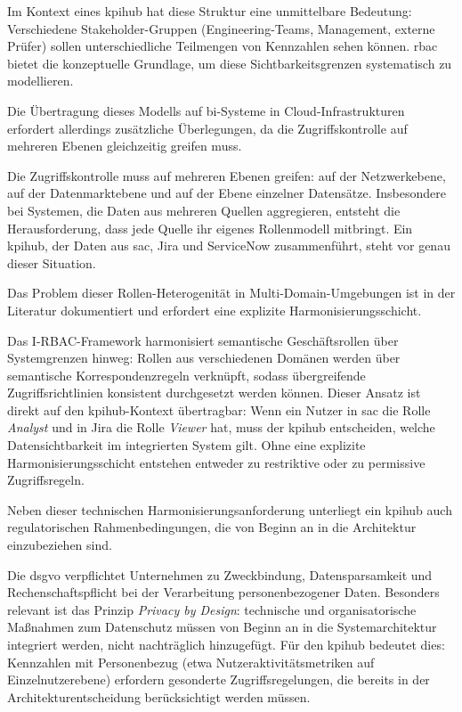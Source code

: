 Im Kontext eines \gls{kpihub} hat diese Struktur eine unmittelbare Bedeutung: Verschiedene Stakeholder-Gruppen (Engineering-Teams, Management, externe Prüfer) sollen unterschiedliche Teilmengen von Kennzahlen sehen können.
\gls{rbac} bietet die konzeptuelle Grundlage, um diese Sichtbarkeitsgrenzen systematisch zu modellieren.

Die Übertragung dieses Modells auf \gls{bi}-Systeme in Cloud-Infrastrukturen erfordert allerdings zusätzliche Überlegungen, da die Zugriffskontrolle auf mehreren Ebenen gleichzeitig greifen muss.

Die Zugriffskontrolle muss auf mehreren Ebenen greifen: auf der Netzwerkebene, auf der Datenmarktebene und auf der Ebene einzelner Datensätze.
Insbesondere bei Systemen, die Daten aus mehreren Quellen aggregieren, entsteht die Herausforderung, dass jede Quelle ihr eigenes Rollenmodell mitbringt.
Ein \gls{kpihub}, der Daten aus \gls{sac}, Jira und ServiceNow zusammenführt, steht vor genau dieser Situation.

Das Problem dieser Rollen-Heterogenität in Multi-Domain-Umgebungen ist in der Literatur dokumentiert und erfordert eine explizite Harmonisierungsschicht.

Das I-RBAC-Framework harmonisiert semantische Geschäftsrollen über Systemgrenzen hinweg: Rollen aus verschiedenen Domänen werden über semantische Korrespondenzregeln verknüpft, sodass übergreifende Zugriffsrichtlinien konsistent durchgesetzt werden können.
Dieser Ansatz ist direkt auf den \gls{kpihub}-Kontext übertragbar: Wenn ein Nutzer in \gls{sac} die Rolle \textit{Analyst} und in Jira die Rolle \textit{Viewer} hat, muss der \gls{kpihub} entscheiden, welche Datensichtbarkeit im integrierten System gilt.
Ohne eine explizite Harmonisierungs\-schicht entstehen entweder zu restriktive oder zu permissive Zugriffsregeln.

Neben dieser technischen Harmonisierungsanforderung unterliegt ein \gls{kpihub} auch regulatorischen Rahmenbedingungen, die von Beginn an in die Architektur einzubeziehen sind.

Die \gls{dsgvo} verpflichtet Unternehmen zu Zweckbindung, Datensparsamkeit und Rechenschaftspflicht bei der Verarbeitung personenbezogener Daten.
Besonders relevant ist das Prinzip \textit{Privacy by Design}: technische und organisatorische Maßnahmen zum Datenschutz müssen von Beginn an in die Systemarchitektur integriert werden, nicht nachträglich hinzugefügt.
Für den \gls{kpihub} bedeutet dies: Kennzahlen mit Personenbezug (etwa Nutzeraktivitätsmetriken auf Einzelnutzerebene) erfordern gesonderte Zugriffsregelungen, die bereits in der Architekturentscheidung berücksichtigt werden müssen.

